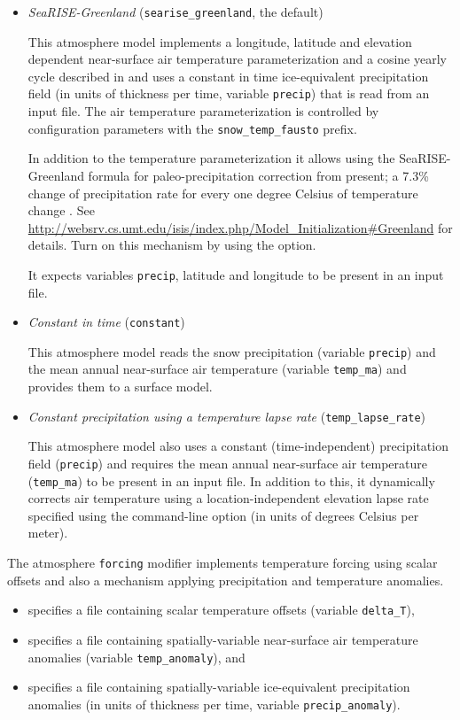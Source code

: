 \begin{itemize}
  \item \emph{SeaRISE-Greenland} (\texttt{searise_greenland}, the default)

    This atmosphere model implements a longitude, latitude and elevation dependent near-surface air temperature parameterization and a cosine yearly cycle described in \cite{Faustoetal2009} and uses a constant in time ice-equivalent precipitation field (in units of thickness per time, variable \texttt{precip}) that is read from an input file.  The air temperature parameterization is controlled by configuration parameters with the \texttt{snow_temp_fausto} prefix.

    In addition to the temperature parameterization it allows using the SeaRISE-Greenland formula for paleo-precipitation correction from present; a 7.3\% change of precipitation rate for every one degree Celsius of temperature change \cite{Huybrechts02}.  See \url{http://websrv.cs.umt.edu/isis/index.php/Model_Initialization#Greenland} for details.  Turn on this mechanism by using the  option.

    It expects variables \texttt{precip}, latitude and longitude to be present in an input file.

 \item \emph{Constant in time} (\texttt{constant})

    This atmosphere model reads the snow precipitation (variable \texttt{precip}) and the mean annual near-surface air temperature (variable \texttt{temp_ma}) and provides them to a surface model.

  \item \emph{Constant precipitation using a temperature lapse rate} (\texttt{temp_lapse_rate})
    
    This atmosphere model also uses a constant (time-independent) precipitation field (\texttt{precip}) and requires the mean annual near-surface air temperature (\texttt{temp_ma}) to be present in an input file. In addition to this, it dynamically corrects air temperature using a location-independent elevation lapse rate specified using the  command-line option (in units of degrees Celsius per meter).
 \end{itemize}

  The atmosphere \texttt{forcing} modifier implements temperature forcing using scalar offsets and also a mechanism applying precipitation and temperature anomalies.
  \begin{itemize}
  \item {} specifies a file containing scalar temperature offsets (variable \texttt{delta_T}), 
  \item {} specifies a file containing spatially-variable near-surface air temperature anomalies (variable \texttt{temp_anomaly}), and
  \item {} specifies a file containing spatially-variable ice-equivalent precipitation anomalies (in units of thickness per time, variable \texttt{precip_anomaly}).
  \end{itemize}

